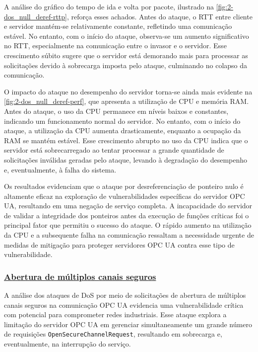             A análise do gráfico do tempo de ida e volta por pacote, ilustrado na \autoref{fig:2-dos_null_deref-rttp}, reforça esses achados. Antes do ataque, o RTT entre cliente e servidor mantém-se relativamente constante, refletindo uma comunicação estável. No entanto, com o início do ataque, observa-se um aumento significativo no RTT, especialmente na comunicação entre o invasor e o servidor. Esse crescimento súbito sugere que o servidor está demorando mais para processar as solicitações devido à sobrecarga imposta pelo ataque, culminando no colapso da comunicação.

            O impacto do ataque no desempenho do servidor torna-se ainda mais evidente na \autoref{fig:2-dos_null_deref-perf}, que apresenta a utilização de CPU e memória RAM. Antes do ataque, o uso da CPU permanece em níveis baixos e constantes, indicando um funcionamento normal do servidor. No entanto, com o início do ataque, a utilização da CPU aumenta drasticamente, enquanto a ocupação da RAM se mantém estável. Esse crescimento abrupto no uso da CPU indica que o servidor está sobrecarregado ao tentar processar a grande quantidade de solicitações inválidas geradas pelo ataque, levando à degradação do desempenho e, eventualmente, à falha do sistema.

            Os resultados evidenciam que o ataque por desreferenciação de ponteiro nulo é altamente eficaz na exploração de vulnerabilidades específicas do servidor OPC UA, resultando em uma negação de serviço completa. A incapacidade do servidor de validar a integridade dos ponteiros antes da execução de funções críticas foi o principal fator que permitiu o sucesso do ataque. O rápido aumento na utilização da CPU e a subsequente falha na comunicação ressaltam a necessidade urgente de medidas de mitigação para proteger servidores OPC UA contra esse tipo de vulnerabilidade.


        \subsubsection*{\underline{Abertura de múltiplos canais seguros}}

            A análise dos ataques de DoS por meio de solicitações de abertura de múltiplos canais seguros na comunicação OPC UA evidencia uma vulnerabilidade crítica com potencial para comprometer redes industriais. Esse ataque explora a limitação do servidor OPC UA em gerenciar simultaneamente um grande número de requisições \texttt{OpenSecureChannelRequest}, resultando em sobrecarga e, eventualmente, na interrupção do serviço.


